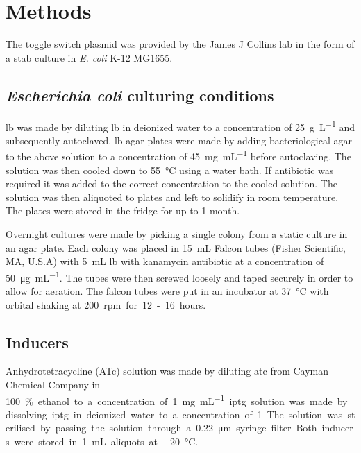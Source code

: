 \section{Methods}

The toggle switch plasmid was provided by the James J Collins lab in the form of a stab culture in \textit{E. coli} K-12 MG1655.

\subsection{\textit{Escherichia coli} culturing conditions}
\label{sec:overnigh_cult}

\acrfull{lb} was made by diluting \acrshort{lb} in deionized water to a concentration of \SI{25}{\gram\per\liter} and subsequently autoclaved. \acrshort{lb} agar plates were made by adding bacteriological agar to the above solution to a concentration of \SI{45}{\milli\gram\per\milli\liter} before autoclaving. The solution was then cooled down to \SI{55}{\celsius} using a water bath. If antibiotic was required it was added to the correct concentration to the cooled solution. The solution was then aliquoted to plates and left to solidify in room temperature. The plates were stored in the fridge for up to 1 month. 

Overnight cultures were made by picking a single colony from a static culture in an agar plate. Each colony was placed in \SI{15}{\milli\liter} Falcon tubes (Fisher Scientific, MA, U.S.A) with \SI{5}{\milli\liter} \acrshort{lb} with kanamycin antibiotic at a concentration of \SI{50}{\micro\gram\per\milli\liter}. The tubes were then screwed loosely and taped securely in order to allow for aeration. The falcon tubes were put in an incubator at \SI{37}{\celsius} with orbital shaking at \SI{200} rpm for 12-16 hours. 

\subsection{Inducers}

Anhydrotetracycline (ATc) solution was made by diluting \acrshort{atc} from Cayman Chemical Company in \SI{100}\% ethanol to a concentration of \SI{1}{\milli\gram\per\milli\liter}. \acrfull{iptg} solution was made by dissolving \acrshort{iptg} in deionized water to a concentration of \SI{1}{\molar}. The solution was sterilised by passing the solution through a \SI{0.22}{\micro\meter} syringe filter. Both inducers were stored in \SI{1}{\milli\liter} aliquots at \SI{-20}{\celsius}. 

